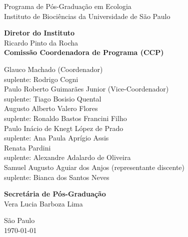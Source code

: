 {\Large Programa de Pós-Graduação em Ecologia \\[1ex]
  Instituto de Biociências da Universidade de São Paulo\\[1ex]
  }
\par
\vspace{0.01\paperheight}

{\large 
  \textbf{Diretor do Instituto} \\[0.5em]
  Ricardo Pinto da Rocha\\
  \vspace{2em}
  \textbf{Comissão Coordenadora de Programa (CCP)} \\[0.5em]
  \begin{spacing}{1.2}
    Glauco Machado (Coordenador)\\
    suplente: Rodrigo Cogni \\ [0.75 em]
    Paulo Roberto Guimarães Junior (Vice-Coordenador)\\
    suplente: Tiago Bosisio Quental \\ [0.75 em]
    Augusto Alberto Valero Flores\\
    suplente: Ronaldo Bastos Francini Filho \\ [0.75 em]
    Paulo Inácio de Knegt López de Prado\\
    suplente: Ana Paula Aprígio Assis\\ [0.75 em]
    Renata Pardini\\
    suplente:  Alexandre Adalardo de Oliveira  \\ [0.75 em]
    Samuel Augusto Aguiar dos Anjos (representante discente)\\ [0.75 em]
    suplente: Bianca dos Santos Neves 
  \end{spacing}
  \vspace{1.25em}
  \textbf{Secretária de Pós-Graduação}\\[0.5em]
  Vera Lucia Barboza Lima\\
}

\vfill

{\Large São Paulo\\
\today}

